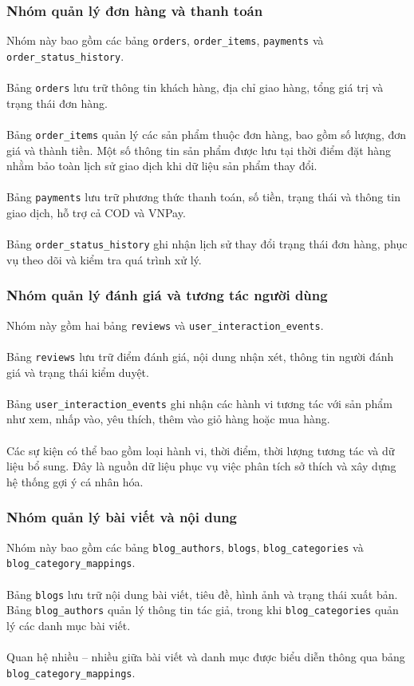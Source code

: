 \documentclass{report}
\begin{document}
\subsubsection{Nhóm quản lý đơn hàng và thanh toán}
Nhóm này bao gồm các bảng \texttt{orders}, \texttt{order\_items}, \texttt{payments} và \texttt{order\_status\_history}.\\\\
Bảng \texttt{orders} lưu trữ thông tin khách hàng, địa chỉ giao hàng, tổng giá trị và trạng thái đơn hàng.\\\\
Bảng \texttt{order\_items} quản lý các sản phẩm thuộc đơn hàng, bao gồm số lượng, đơn giá và thành tiền. Một số thông tin sản phẩm được lưu tại thời điểm đặt hàng nhằm bảo toàn lịch sử giao dịch khi dữ liệu sản phẩm thay đổi.\\\\
Bảng \texttt{payments} lưu trữ phương thức thanh toán, số tiền, trạng thái và thông tin giao dịch, hỗ trợ cả COD và VNPay.\\\\
Bảng \texttt{order\_status\_history} ghi nhận lịch sử thay đổi trạng thái đơn hàng, phục vụ theo dõi và kiểm tra quá trình xử lý.

\subsubsection{Nhóm quản lý đánh giá và tương tác người dùng}
Nhóm này gồm hai bảng \texttt{reviews} và \texttt{user\_interaction\_events}.\\\\
Bảng \texttt{reviews} lưu trữ điểm đánh giá, nội dung nhận xét, thông tin người đánh giá và trạng thái kiểm duyệt.\\\\
Bảng \texttt{user\_interaction\_events} ghi nhận các hành vi tương tác với sản phẩm như xem, nhấp vào, yêu thích, thêm vào giỏ hàng hoặc mua hàng.\\\\
Các sự kiện có thể bao gồm loại hành vi, thời điểm, thời lượng tương tác và dữ liệu bổ sung. Đây là nguồn dữ liệu phục vụ việc phân tích sở thích và xây dựng hệ thống gợi ý cá nhân hóa.

\subsubsection{Nhóm quản lý bài viết và nội dung}
Nhóm này bao gồm các bảng \texttt{blog\_authors}, \texttt{blogs}, \texttt{blog\_categories} và \texttt{blog\_category\_mappings}.\\\\
Bảng \texttt{blogs} lưu trữ nội dung bài viết, tiêu đề, hình ảnh và trạng thái xuất bản. Bảng \texttt{blog\_authors} quản lý thông tin tác giả, trong khi \texttt{blog\_categories} quản lý các danh mục bài viết.\\\\
Quan hệ nhiều -- nhiều giữa bài viết và danh mục được biểu diễn thông qua bảng \texttt{blog\_category\_mappings}.
\end{document}
